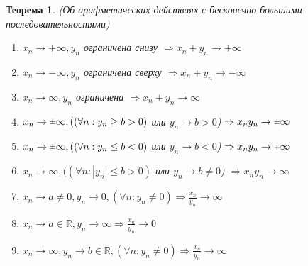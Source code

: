 \documentclass[11pt,a4paper,titlepage]{article}
\newtheorem*{theorem}{Теорема}
\renewcommand{\implies}{\Rightarrow}
\newcommand{\rpm}{\raisebox{.2ex}{$\scriptstyle\pm$}}
\newcommand{\rmp}{\raisebox{.2ex}{$\scriptstyle\mp$}}
\newcommand{\R}{\mathbb{R}}
\begin{document}
    \begin{theorem}
        (Об арифметических действиях с бесконечно большими последовательностями)
        \begin{enumerate}
            \item $x_n \to +\infty, {y_n}$ ограничена снизу $\implies x_n + y_n \to +\infty $
            \item $x_n \to -\infty, {y_n}$ ограничена сверху $\implies x_n + y_n \to -\infty $
            \item $x_n \to \infty, {y_n}$ ограничена $\implies x_n + y_n \to \infty $
            \item $x_n \to \rpm\infty, ((\forall n: y_n \geq b > 0)$ или $y_n \to b > 0$) $\implies x_n y_n \to \rpm\infty$
            \item $x_n \to \rpm\infty, ((\forall n: y_n \leq b < 0)$ или $y_n \to b < 0$) $\implies x_n y_n \to \rmp\infty$
            \item $x_n \to \infty, ((\forall n: |y_n| \leq b > 0)$ или $y_n \to b \neq 0$) $\implies x_n y_n \to \infty$
            \item $x_n \to a \neq 0, y_n \to 0, (\forall n: y_n \neq 0) \implies \frac{x_n}{y_n} \to \infty$
            \item $x_n \to a \in \R, y_n \to \infty \implies \frac{x_n}{y_n} \to 0$
            \item $x_n \to \infty, y_n \to b \in \R, (\forall n: y_n \neq 0) \implies \frac{x_n}{y_n} \to \infty$
        \end{enumerate}
    \end{theorem}
\end{document}
